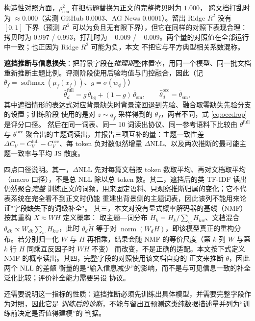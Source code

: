 \documentclass[11pt]{ctexart}
\begin{document}
构造性对照方面，$\rho^2_{\mathrm{cca}}$ 在把标题替换为正文的完整拷贝时为 $1.000$，
跨文档打乱时为 $\approx 0.000$（实测 GitHub 0.0003、AG News 0.0001）。留出 Ridge $R^2$
没有 $[0,1]$ 下界（预测 $R^2$ 可以为负且无有限下界），但它在同样的对照下表现合理：
拷贝时为 0.997 / 0.993，打乱时为 $-0.009$ / $-0.009$。两个量的对照值在全部运行中一致；也正因为 Ridge $R^2$ 可能为负，本文
不把它与平方典型相关系数混称。

\textbf{遮挡推断与信息损失}：把背景字段在\emph{推理期}整体置零，用同一个模型、同一批文档
重新推断主题比例。评测阶段使用后验均值与门控融合，因此（记
$\bar\theta_f=\operatorname{softmax}(\mu_f(x_f))$、$g=\sigma(w_\phi)$）
\begin{equation}
\hat\theta^{\mathrm{full}}_d=g\,\bar\theta_{\mathrm{bg}}+(1-g)\,\bar\theta_{\mathrm{sm}},
\qquad
\hat\theta^{\mathrm{occ}}_d=\bar\theta_{\mathrm{sm}},
\label{eq:occdrop}
\end{equation}
其中遮挡情形的表达式对应背景缺失时背景流回退到先验、融合取零缺失先验分支的设置；训练阶段
使用的是对 $z\sim q_f$ 采样得到的 $\theta_f$，两者不同，式 \eqref{eq:occdrop} 是评分口径。
然后在同一词表、同一 10 词读出协议、同一参考语料下比较由 $\theta^{\mathrm{full}}$ 与
$\theta^{\mathrm{occ}}$ 聚合出的主题词读出，并报告三项互补的量：主题一致性差
$\Delta C_V=C_V^{\mathrm{full}}-C_V^{\mathrm{occ}}$、每 token 负对数似然增量
$\Delta\mathrm{NLL}$、以及两次推断的最可能主题一致率与平均 JS 散度。

四点口径说明。其一，$\Delta\mathrm{NLL}$ 先对每篇文档按 token 数取平均、再对文档取平均
（macro 口径），不是总 NLL 除以总 token 数。其二，遮挡后的类 TF-IDF 读出仍然聚合\emph{完整}
训练正文的词频，用来固定语料、只观察推断归属的变化；它不代表系统在完全看不到正文时仍能
重建出背景侧的主题词表，因此该列不能用来论证"字段缺失下的词级补全"。
其三，本文对没有显式概率解码器的基线（NMF）按其重构 $X\approx WH$
定义概率：
取主题—词分布 $\tilde H_k=H_k/\sum_w H_{kw}$、文档混合
$\theta_{dk}\propto W_{dk}\sum_w H_{kw}$，此时 $\theta_d\tilde H$ 等于对
$\operatorname{norm}(W_dH)$，即该模型真正的重构分布。若分别归一化 $W$ 与 $H$
再相乘，结果会随 NMF 的等价尺度（第 $k$ 列 $W$ 与第 $k$ 行 $H$ 同乘互反因子时 $WH$ 不变）
而改变，不是正确的适配。本文按下式定义 NMF 的概率读出。其四，完整字段的对照使用该文档自身的
正文来推断 $\theta$，因此两个 NLL 的差额
衡量的是“输入信息减少”的影响，而不是与可见信息一致的补全泛化比较；评价补全能力需要另设
协议。

还需要说明这一指标的性质：遮挡推断必须先训练出具体模型，并需要完整字段作为对照，因此它是
\emph{训练后的诊断}，不能与留出互预测这类纯数据描述量并列为“训练前决定是否值得建模”的
判据。
\end{document}
